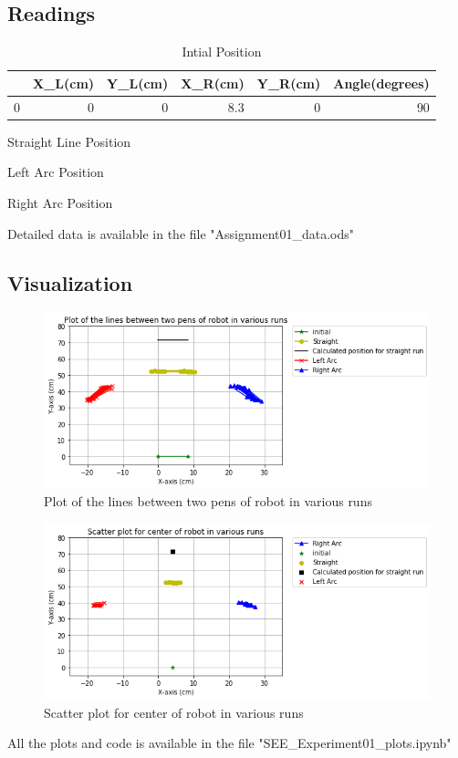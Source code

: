 \documentclass[10pt,a4paper]{article}
\begin{document}
		\subsection{Readings}
		\begin{table}[H]
			\centering
			\begin{tabular}{lrrrrr}
				\toprule
				{} &  X\_L(cm) &  Y\_L(cm) &  X\_R(cm) &  Y\_R(cm) &  Angle(degrees) \\
				\midrule
				0 &        0 &        0 &      8.3 &        0 &              90 \\
				\bottomrule
			\end{tabular}
			\caption{Intial Position}
		\end{table}
		\begin{table}[H]
			\centering
			
			\caption{Straight Line Position}
		\end{table}
		\begin{table}[H]
			\centering
			
			\caption{Left Arc Position}
		\end{table}
		\begin{table}[H]
			\centering
			
			\caption{Right Arc Position}
		\end{table}
		Detailed data is available in the file "Assignment01\_data.ods"
	 \subsection{Visualization}
		 \begin{figure}[H]
		 	\centering
		 	\includegraphics[scale=0.5]{line_plot.png}
		 	\caption{Plot of the lines between two pens of robot in various runs}
		 \end{figure}
		 \begin{figure}[H]
		 	\centering
		 	\includegraphics[scale=0.5]{scatter_plot.png}
		 	\caption{Scatter plot for center of robot in various runs}
		 \end{figure}
	 All the plots and code is available in the file "SEE\_Experiment01\_plots.ipynb"		
\end{document}
